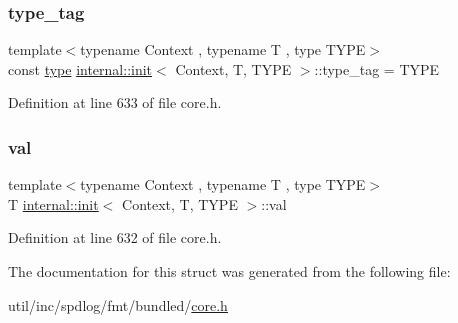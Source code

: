 \subsubsection{\texorpdfstring{type\+\_\+tag}{type\_tag}}
{\footnotesize\ttfamily template$<$typename Context , typename T , type T\+Y\+PE$>$ \\
const \hyperlink{namespaceinternal_a8661864098ac0acff9a6dd7e66f59038}{type} \hyperlink{structinternal_1_1init}{internal\+::init}$<$ Context, T, T\+Y\+PE $>$\+::type\+\_\+tag = T\+Y\+PE\hspace{0.3cm}{\ttfamily [static]}}



Definition at line 633 of file core.\+h.

\mbox{\label{structinternal_1_1init_ae4d091cc19f078cdb2f55a91704c5e87}} 
\subsubsection{\texorpdfstring{val}{val}}
{\footnotesize\ttfamily template$<$typename Context , typename T , type T\+Y\+PE$>$ \\
T \hyperlink{structinternal_1_1init}{internal\+::init}$<$ Context, T, T\+Y\+PE $>$\+::val}



Definition at line 632 of file core.\+h.



The documentation for this struct was generated from the following file\+:\begin{DoxyCompactItemize}
\item 
util/inc/spdlog/fmt/bundled/\hyperlink{core_8h}{core.\+h}\end{DoxyCompactItemize}
